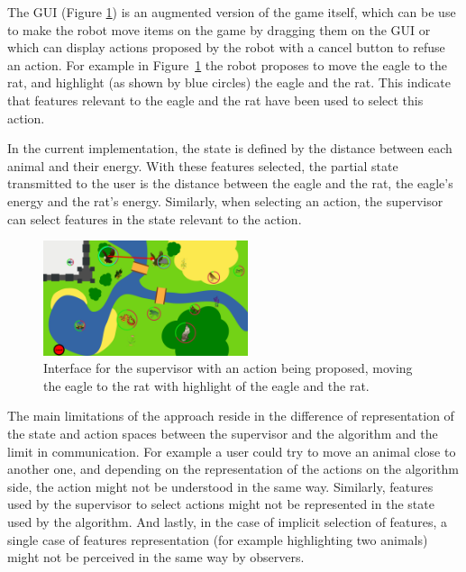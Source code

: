 \documentclass[letterpaper]{article} %
\begin{document}
The GUI (Figure \ref{fig:gui}) is an augmented
version of the game itself, which can be use to make the robot move items on the
game by dragging them on the GUI or which can display actions proposed by the
robot with a cancel button to refuse an action. For example in
Figure~\ref{fig:gui} the robot proposes to move the eagle to the rat, and
highlight (as shown by blue circles) the eagle and the rat. This indicate that
features relevant to the eagle and the rat have been used to select this action.

In the current implementation, the state is defined by the distance between each
animal and their energy. With these features selected, the partial state
transmitted to the user is the distance between the eagle and the rat, the
eagle's energy and
the rat's energy. Similarly, when selecting an action, the supervisor can 
select features in the state relevant to the action.

\begin{figure}
        \centering
    \includegraphics[width=60mm]{./figs/proposition.png}
    \caption{Interface for the supervisor with an action being proposed, moving
        the eagle to the rat with highlight of the eagle and the rat.}
        \label{fig:gui}
\end{figure}


The main limitations of the approach reside in the difference of
representation of the state and action spaces between the supervisor and the
algorithm and the limit in communication. For example a user could try to move
an animal close to another one,
and depending on the representation of the actions on the algorithm side, the
action might not be understood in the same way. Similarly, features used by the
supervisor to select actions might not be represented in the state used by the
algorithm. And lastly, in the case of implicit selection of features, a single
case of features representation (for example highlighting two animals) might not
be perceived in the same way by observers.
\end{document}
